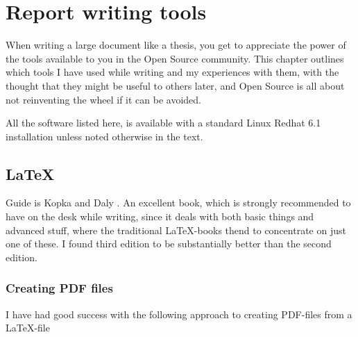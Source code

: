 
\chapter{Report writing tools}

When writing a large document like a thesis, you get to appreciate the
power of the tools available to you in the Open Source community.
This chapter outlines which tools I have used while writing and my
experiences with them, with the thought that they might be useful to
others later, and Open Source is all about not reinventing the wheel
if it can be avoided.  

All the software listed here, is available with a standard Linux
Redhat 6.1 installation unless noted otherwise in the text.


\section{\LaTeX}
\label{sec:report-writing-tools-latex}


Guide is Kopka and Daly \cite{a-guide-to-latex}.  An excellent book,
which is strongly recommended to have on the desk while writing, since
it deals with both basic things and advanced stuff, where the
traditional LaTeX-books thend to concentrate on just one of these.  I
found third edition to be substantially better than the second edition.



\subsection{Creating PDF files}
\label{sec:report-writing-creating-pdf-files}

I have had good success with the following approach to creating
PDF-files from a \LaTeX-file



